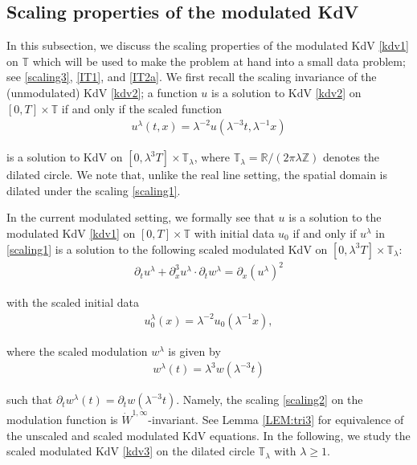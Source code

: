 \documentclass[letterpaper, 11pt,  reqno]{amsart}
\newcommand{\1}{\hspace{0.5mm}\text{I}\hspace{0.5mm}}
\newcommand{\noi}{\noindent}
\newcommand{\Z}{\mathbb{Z}}
\newcommand{\R}{\mathbb{R}}
\newcommand{\T}{\mathbb{T}}
\newcommand{\ld}{\lambda}
\newcommand{\dx}{\partial_x}
\newcommand{\dt}{\partial_t}
\numberwithin{equation}{section}
\numberwithin{theorem}{section}
\begin{document}
\subsection{Scaling properties of the modulated KdV}
\label{SUBSEC:I1}


In this subsection, we discuss
the scaling properties
of the modulated KdV \eqref{kdv1}
on $\T$
which will be used to make the problem at hand
into a small data problem; see \eqref{scaling3},  \eqref{IT1}, and \eqref{IT2a}.
We first recall the scaling invariance
of the (unmodulated) KdV \eqref{kdv2};
a function  $u$ is a solution to KdV \eqref{kdv2} on  $[0, T]\times \T$
 if and only if  
  the scaled function 
\begin{align}
 u^{\ld}(t,x)=\ld^{-2}u(\ld^{-3}t,\ld^{-1}x)
 \label{scaling1}
\end{align}
 
 \noi
  is  a solution to   KdV  on $[0,\ld^3T]\times \T_\ld$,
where
  $\T_\ld = \R/(2\pi \ld \Z)$
denotes the dilated circle.
We note that, unlike the real line setting, 
the spatial domain is dilated under the scaling \eqref{scaling1}.

In the current modulated setting, 
we formally see that 
  $u$ is a solution to  the modulated KdV \eqref{kdv1} on $[0, T] \times \T$ with initial data $u_0$
  if and only if 
$u^\ld$ in \eqref{scaling1}
is a solution to the 
following scaled modulated KdV  on $[0, \ld^3 T] \times \T_\ld$:
\begin{align}
\dt u^{\ld} +    \dx^3 u^{\ld}\cdot \dt w^{\ld}  =\partial_x(u^{\ld} )^2
\label{kdv3}
\end{align}




\noi
with the scaled initial data
\begin{align}
u_0^\ld(x) = \ld^{-2} u_0(\ld^{-1}x), 
\label{scaling1a}
\end{align}

\noi
where the scaled modulation $w^\ld$ is given by
\begin{align}
w^{\ld}(t)= \ld^3w(\ld^{-3}t)
\label{scaling2} 
\end{align}

\noi
such that $\dt w^\ld(t) = \dt w(\ld^{-3} t)$.
Namely, the scaling \eqref{scaling2} on the modulation function
is $\dot W^{1, \infty}$-invariant.
See Lemma \ref{LEM:tri3}
for  equivalence of the unscaled and scaled modulated KdV equations.
In the following, we study the scaled modulated KdV \eqref{kdv3} on 
the dilated circle $\T_\ld$ with $\ld \ge 1$.
\end{document}
